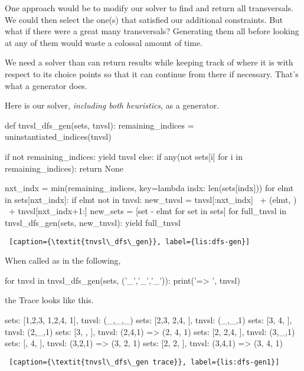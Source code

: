 One approach would be to modify our solver to find and return all transversals. We could then select the one(s) that satisfied our additional constraints. But what if there were a great many transversals? Generating them all before looking at any of them would waste a colossal amount of time. 

We need a solver than can return results while keeping track of where it is with respect to its choice points so that it can continue from there if necessary. That's what a generator does. 

Here is our solver, \textit{including both heuristics}, as a generator.

\begin{minipage}[c]{0.45\textwidth}
\begin{python1}[numbers=left]
def tnvsl_dfs_gen(sets, tnvsl):
  remaining_indices = uninstantiated_indices(tnvsl)

  if not remaining_indices: yield tnvsl
  else:
    if any(not sets[i] for i in remaining_indices):
      return None
      
    nxt_indx = min(remaining_indices,
                   key=lambda indx: len(sets[indx]))
    for elmt in sets[nxt_indx]:
      if elmt not in tnvsl:
        new_tnvsl = tnvsl[:nxt_indx] \
                    + (elmt, ) \
                    + tnvsl[nxt_indx+1:]
        new_sets = [set - {elmt} for set in sets]
        for full_tnvsl in tnvsl_dfs_gen(sets, 
                                        new_tnvsl):
          yield full_tnvsl
\end{python1}
\begin{lstlisting} [caption={\textit{tnvsl\_dfs\_gen}}, label={lis:dfs-gen}]
\end{lstlisting}
\end{minipage}

When called as in the following,

\begin{minipage}[c]{0.45\textwidth}
\begin{python1}[numbers=left]
for tnvsl in tnvsl_dfs_gen(sets, ('_','_','_')):
    print('=> ', tnvsl)
\end{python1}
\end{minipage}

the Trace looks like this.

\begin{minipage}[c]{0.45\textwidth}
\begin{python1}[numbers=left]
sets: [{1,2,3}, {1,2,4}, {1}], tnvsl: (_,_,_)
  sets: [{2,3}, {2,4}, {}], tnvsl: (_,_,1)
    sets: [{3}, {4}, {}], tnvsl: (2,_,1)
      sets: [{3}, {}, {}], tnvsl: (2,4,1)
=>  (2, 4, 1)
    sets: [{2}, {2,4}, {}], tnvsl: (3,_,1)
      sets: [{}, {4}, {}], tnvsl: (3,2,1)
=>  (3, 2, 1)
      sets: [{2}, {2}, {}], tnvsl: (3,4,1)
=>  (3, 4, 1)
\end{python1}
\begin{lstlisting} [caption={\textit{tnvsl\_dfs\_gen trace}}, label={lis:dfs-gen1}]
\end{lstlisting}
\end{minipage}

